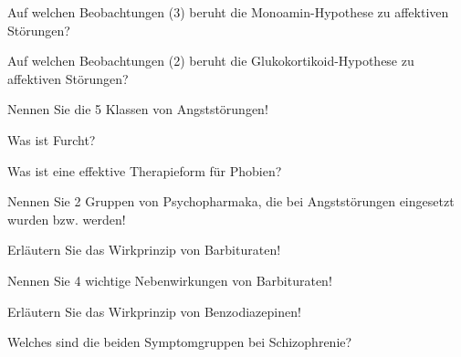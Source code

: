 \documentclass[10pt, a4paper]{exam}
\begin{document}
\begin{questions}
\begin{solution}
  \end{solution}

  \question Auf welchen Beobachtungen (3) beruht die Monoamin-Hypothese zu affektiven Störungen?
  \begin{solution}

  \end{solution}

  \question Auf welchen Beobachtungen (2) beruht die Glukokortikoid-Hypothese zu affektiven Störungen?
  \begin{solution}

  \end{solution}

  \question Nennen Sie die 5 Klassen von Angststörungen!
  \begin{solution}

  \end{solution}

  \question Was ist Furcht?
  \begin{solution}

  \end{solution}

  \question Was ist eine effektive Therapieform für Phobien?
  \begin{solution}

  \end{solution}

  \question Nennen Sie 2 Gruppen von Psychopharmaka, die bei Angststörungen eingesetzt wurden bzw. werden!
  \begin{solution}

  \end{solution}

  \question Erläutern Sie das Wirkprinzip von Barbituraten!
  \begin{solution}

  \end{solution}

  \question Nennen Sie 4 wichtige Nebenwirkungen von Barbituraten!
  \begin{solution}

  \end{solution}

  \question Erläutern Sie das Wirkprinzip von Benzodiazepinen!
  \begin{solution}

  \end{solution}

  \question Welches sind die beiden Symptomgruppen bei Schizophrenie?
  \begin{solution}


\end{solution}
\end{questions}
\end{document}
